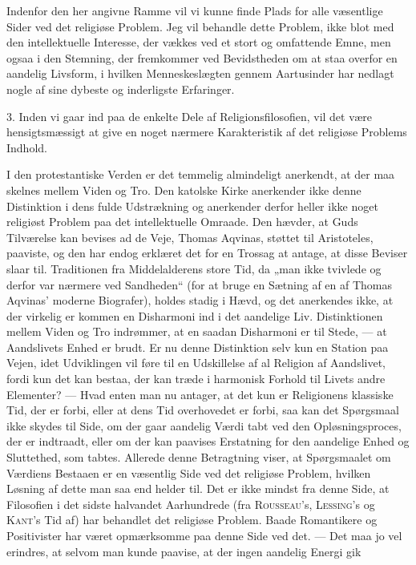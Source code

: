 \documentclass[12pt,a4paper,openany]{book}
\newcommand{\opage}[1]{\marginnote{\footnotesize\textit{[#1]}}}
\begin{document}
Indenfor den her angivne Ramme vil vi kunne finde Plads for alle
væsentlige Sider ved det religiøse Problem. Jeg vil behandle dette
Problem, ikke blot med den intellektuelle Interesse, der vækkes ved et
stort og omfattende Emne, men ogsaa i den Stemning, der fremkommer ved
Bevidstheden om at staa overfor en aandelig Livsform, i hvilken
Menneskeslægten gennem Aartusinder har nedlagt nogle af sine dybeste og
inderligste Erfaringer.

3. Inden vi gaar ind paa de enkelte Dele af Religionsfilosofien, vil det
være hensigtsmæssigt at give en noget nærmere Karakteristik af det
religiøse Problems Indhold.

I den protestantiske Verden er det temmelig almindeligt anerkendt, at
der maa skelnes mellem Viden og Tro. Den katolske Kirke anerkender ikke
denne Distinktion i dens fulde Udstrækning og anerkender derfor heller
ikke noget religiøst Problem paa det intellektuelle Omraade. Den hævder,
at Guds Tilværelse kan bevises ad de Veje, Thomas Aqvinas, støttet til
Aristoteles, paaviste, og den har endog erklæret det for en Trossag at
antage, at disse Beviser slaar til. Traditionen fra Middelalderens store
Tid, da „man ikke tvivlede og derfor var nærmere ved Sandheden“ (for at
bruge en Sætning af en af Thomas Aqvinas’ moderne Biografer), holdes
stadig i Hævd, og det anerkendes ikke, at der virkelig er
\opage{8}kommen en Disharmoni ind i det aandelige Liv. Distinktionen
mellem Viden og Tro indrømmer, at en saadan Disharmoni er til Stede, ---
at Aandslivets Enhed er brudt. Er nu denne Distinktion selv kun en
Station paa Vejen, idet Udviklingen vil føre til en Udskillelse af al
Religion af Aandslivet, fordi kun det kan bestaa, der kan træde i
harmonisk Forhold til Livets andre Elementer? --- Hvad enten man nu
antager, at det kun er Religionens klassiske Tid, der er forbi, eller at
dens Tid overhovedet er forbi, saa kan det Spørgsmaal ikke skydes til
Side, om der gaar aandelig Værdi tabt ved den Opløsningsproces, der er
indtraadt, eller om der kan paavises Erstatning for den aandelige Enhed
og Sluttethed, som tabtes. Allerede denne Betragtning viser, at
Spørgsmaalet om Værdiens Bestaaen er en væsentlig Side ved det religiøse
Problem, hvilken Løsning af dette man saa end helder til. Det er ikke
mindst fra denne Side, at Filosofien i det sidste halvandet Aarhundrede
(fra \textsc{Rousseau}’s, \textsc{Lessing}’s og \textsc{Kant}’s Tid af)
har behandlet det religiøse Problem. Baade Romantikere og Positivister
har været opmærksomme paa denne Side ved det. --- Det maa jo vel
erindres, at selvom man kunde paavise, at der ingen aandelig Energi gik
\end{document}
